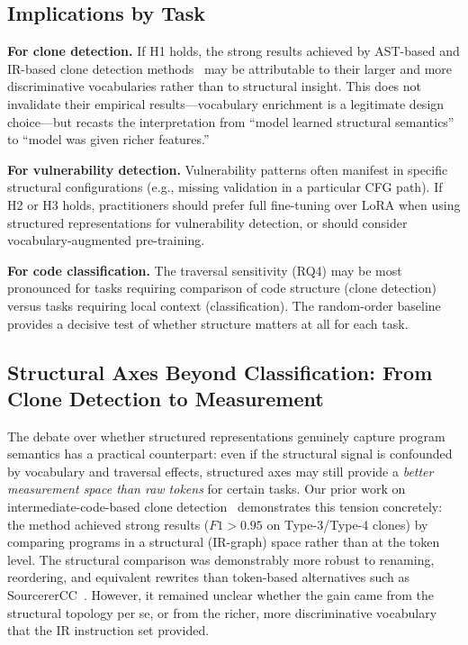 \documentclass[pdflatex,sn-mathphys,Numbered]{sn-jnl}
\begin{document}
\subsection{Implications by Task}

\textbf{For clone detection.} If H1 holds, the strong results achieved by AST-based and IR-based clone detection methods~\citep{yuan2023clone,wei2019cdlhd,white2016deep} may be attributable to their larger and more discriminative vocabularies rather than to structural insight. This does not invalidate their empirical results---vocabulary enrichment is a legitimate design choice---but recasts the interpretation from ``model learned structural semantics'' to ``model was given richer features.''

\textbf{For vulnerability detection.} Vulnerability patterns often manifest in specific structural configurations (e.g., missing validation in a particular CFG path). If H2 or H3 holds, practitioners should prefer full fine-tuning over LoRA when using structured representations for vulnerability detection, or should consider vocabulary-augmented pre-training.

\textbf{For code classification.} The traversal sensitivity (RQ4) may be most pronounced for tasks requiring comparison of code structure (clone detection) versus tasks requiring local context (classification). The random-order baseline provides a decisive test of whether structure matters at all for each task.

\subsection{Structural Axes Beyond Classification: From Clone Detection to Measurement}

The debate over whether structured representations genuinely capture program semantics has a practical counterpart: even if the structural signal is confounded by vocabulary and traversal effects, structured axes may still provide a \emph{better measurement space than raw tokens} for certain tasks. Our prior work on intermediate-code-based clone detection~\citep{yuan2023clone} demonstrates this tension concretely: the method achieved strong results ($F1 > 0.95$ on Type-3/Type-4 clones) by comparing programs in a structural (IR-graph) space rather than at the token level. The structural comparison was demonstrably more robust to renaming, reordering, and equivalent rewrites than token-based alternatives such as SourcererCC~\citep{sajnani2016sourcerercc}. However, it remained unclear whether the gain came from the structural topology per se, or from the richer, more discriminative vocabulary that the IR instruction set provided.
\end{document}
